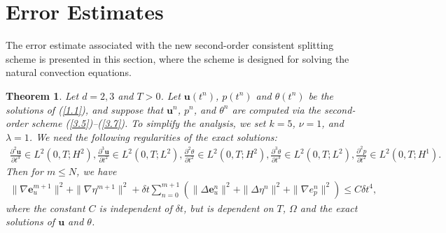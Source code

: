 \documentclass[10pt]{article}
\newtheorem{theorem}{Theorem}[section]
\begin{document}
	\section{Error Estimates}
	\setcounter{equation}{0}
	The error estimate associated with the new second-order consistent splitting scheme is presented in this section, where the scheme is designed for solving the natural convection equations.
	\begin{theorem}\label{The4.1}
		{Let \( d = 2, 3 \) and \( T > 0 \). Let \( \bm{u}(t^n) \), \( p(t^n) \) and \( \theta(t^n) \) be the solutions of (\ref{1.1}), and suppose that \( \bm{u}^n \), \( p^n \), and \( \theta^n \) are computed via the second-order scheme (\ref{3.5})–(\ref{3.7}). To simplify the analysis, we set \( k = 5 \), \( \nu = 1 \), and \( \lambda = 1 \). We need the following regularities of the exact solutions:
			\begin{align}
				\frac{\partial^2\bm{u}}{\partial t^3}\in\mathit{L}^2(0,\mathit{T};\mathit{H^2}), \frac{\partial^3\bm{u}}{\partial t^2}\in\mathit{L}^2(0,\mathit{T};\mathit{L^2}), 
				\frac{\partial^2\theta}{\partial t^2}\in\mathit{L}^2(0,\mathit{T};\mathit{H^2}), \frac{\partial^3\theta}{\partial t^3}\in\mathit{L}^2(0,\mathit{T};\mathit{L^2}), \frac{\partial^2p}{\partial t^2}\in\mathit{L}^2(0,\mathit{T};\mathit{H^1}).\nonumber
			\end{align}
			Then for $m\leq N$, we have
			\begin{align}
				\|\nabla\bm{e}_u^{m+1}\|^2+\|\nabla\eta^{m+1}\|^2+\delta t\sum_{n=0}^{m+1}(\|\Delta\bm{e}_u^n\|^2+ \|\Delta\eta^n\|^2+\|\nabla e_p^n\|^2)\leq C\delta t^4,\nonumber
			\end{align}
			where the constant $C$ is  independent of $\delta t$, but is dependent on  $T$, $\Omega$ and the exact solutions of $\bm{u}$ and $\theta$.
		}
	\end{theorem}
\end{document}
